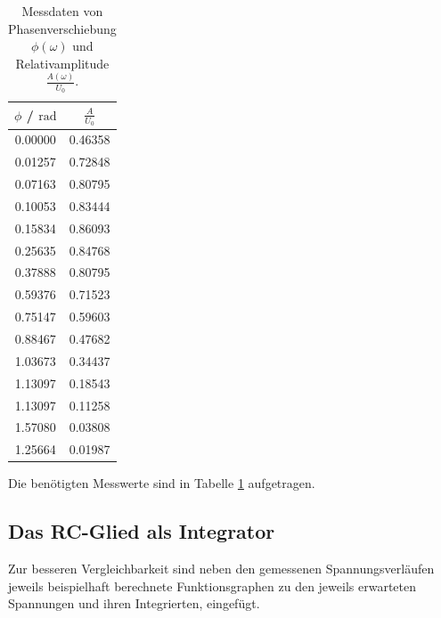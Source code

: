 \begin{table}
	\caption{Messdaten von Phasenverschiebung $\phi(\omega)$ und Relativamplitude $\frac{A(\omega)}{U_0}$.}
	\centering
	\label{tab:polars}
	\begin{tabular}{cc}
		\toprule
		$\phi$ / $\si{\radian}$ & $\frac{A}{U_0}$ \\
		\midrule
		0.00000                 & 0.46358         \\
		0.01257                 & 0.72848         \\
		0.07163                 & 0.80795         \\
		0.10053                 & 0.83444         \\
		0.15834                 & 0.86093         \\
		0.25635                 & 0.84768         \\
		0.37888                 & 0.80795         \\
		0.59376                 & 0.71523         \\
		0.75147                 & 0.59603         \\
		0.88467                 & 0.47682         \\
		1.03673                 & 0.34437         \\
		1.13097                 & 0.18543         \\
		1.13097                 & 0.11258         \\
		1.57080                 & 0.03808         \\
		1.25664                 & 0.01987         \\
		\bottomrule
	\end{tabular}
\end{table}

Die benötigten Messwerte sind in Tabelle \ref{tab:polars} aufgetragen.
\subsection{Das RC-Glied als Integrator}
Zur besseren Vergleichbarkeit sind neben den gemessenen Spannungsverläufen jeweils beispielhaft berechnete Funktionsgraphen zu den jeweils erwarteten Spannungen und ihren Integrierten, eingefügt.


